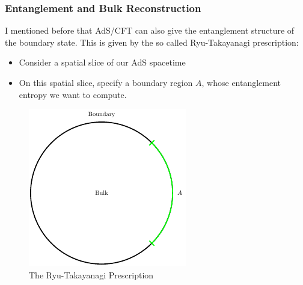 \documentclass[8pt,aspectratio=169]{beamer}
\begin{document}
\begin{frame}
\frametitle{Entanglement and Bulk Reconstruction}

I mentioned before that AdS/CFT can also give the entanglement structure of the boundary state. This is given by the so called Ryu-Takayanagi prescription: 

\begin{minipage}[t]{0.55\linewidth}

\begin{itemize}

\item Consider a spatial slice of our AdS spacetime

\item On this spatial slice, specify a boundary region $A$, whose entanglement entropy we want to compute. 

\end{itemize}

\end{minipage}\hfill
%
\begin{minipage}[t]{0.44\linewidth}

\begin{figure}
    \begin{center}
    
        \includegraphics[scale=1]{RT1}    
    
    \end{center}
    \caption{The Ryu-Takayanagi Prescription}
    \label{fig:WDW}
\end{figure}

\end{minipage}

\end{frame}
\end{document}
